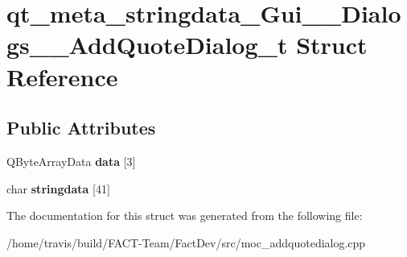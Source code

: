 \hypertarget{structqt__meta__stringdata__Gui____Dialogs____AddQuoteDialog__t}{\section{qt\-\_\-meta\-\_\-stringdata\-\_\-\-Gui\-\_\-\-\_\-\-Dialogs\-\_\-\-\_\-\-Add\-Quote\-Dialog\-\_\-t Struct Reference}
\label{structqt__meta__stringdata__Gui____Dialogs____AddQuoteDialog__t}
}
\subsection*{Public Attributes}
\begin{DoxyCompactItemize}
\item 
\hypertarget{structqt__meta__stringdata__Gui____Dialogs____AddQuoteDialog__t_ae02f1845a66399406d34ca1345cc2079}{Q\-Byte\-Array\-Data {\bfseries data} \mbox{[}3\mbox{]}}\label{structqt__meta__stringdata__Gui____Dialogs____AddQuoteDialog__t_ae02f1845a66399406d34ca1345cc2079}

\item 
\hypertarget{structqt__meta__stringdata__Gui____Dialogs____AddQuoteDialog__t_a7cdceb03330522cbf539af8c98572f36}{char {\bfseries stringdata} \mbox{[}41\mbox{]}}\label{structqt__meta__stringdata__Gui____Dialogs____AddQuoteDialog__t_a7cdceb03330522cbf539af8c98572f36}

\end{DoxyCompactItemize}


The documentation for this struct was generated from the following file\-:\begin{DoxyCompactItemize}
\item 
/home/travis/build/\-F\-A\-C\-T-\/\-Team/\-Fact\-Dev/src/moc\-\_\-addquotedialog.\-cpp\end{DoxyCompactItemize}

